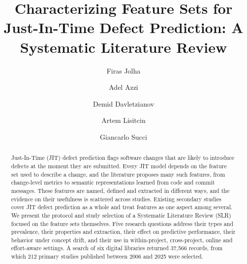 \documentclass[sigconf,review]{acmart}
\begin{document}
\title[Feature Sets for JIT Defect Prediction: An SLR]{Characterizing Feature Sets for Just-In-Time Defect Prediction: A Systematic Literature Review}

\author{Firas Jolha}

\author{Adel Azzi}

\author{Demid Davletzianov}

\author{Artem Lisitcin}

\author{Giancarlo Succi}

\renewcommand{\shortauthors}{Jolha et al.}


\begin{abstract}
Just-In-Time (JIT) defect prediction flags software changes that are likely to introduce defects at the moment they are submitted. Every JIT model depends on the feature set used to describe a change, and the literature proposes many such features, from change-level metrics to semantic representations learned from code and commit messages. These features are named, defined and extracted in different ways, and the evidence on their usefulness is scattered across studies. Existing secondary studies cover JIT defect prediction as a whole and treat features as one aspect among several. We present the protocol and study selection of a Systematic Literature Review (SLR) focused on the feature sets themselves. Five research questions address their types and prevalence, their properties and extraction, their effect on predictive performance, their behavior under concept drift, and their use in within-project, cross-project, online and effort-aware settings. A search of six digital libraries returned 37,566 records, from which 212 primary studies published between 2006 and 2025 were selected.
\end{abstract}
\end{document}
